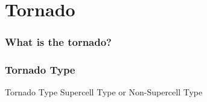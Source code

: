 \documentclass[10pt,a4j,openany,dvipdfmx]{jsarticle}
\begin{document}

\section{Tornado} %
\label{sec:tornado}

\subsubsection{What is the tornado?} %
\label{ssub:what_is_the_tornado_}





\subsubsection{Tornado Type} %
\label{ssub:tornado_type}

\begin{oceanbox}{Tornado Type}
Supercell Type or Non-Supercell Type
\end{oceanbox}



\end{document}
